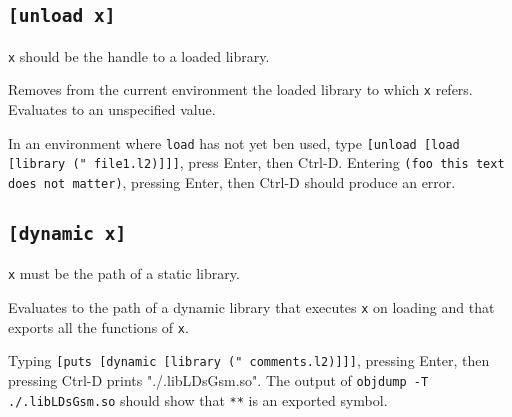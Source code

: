 \documentclass[twocolumn,landscape]{article}
\begin{document}
    \subsection{\lstinline{[unload x]}}
      \lstinline{x} should be the handle to a loaded library.

      Removes from the current environment the loaded library to which \lstinline{x} refers. Evaluates to an unspecified value.

      In an environment where \lstinline{load} has not yet ben used, type \lstinline{[unload [load [library (" file1.l2)]]]}, press Enter, then Ctrl-D. Entering \lstinline{(foo this text does not matter)}, pressing Enter, then Ctrl-D should produce an error.

    \subsection{\lstinline{[dynamic x]}}
      \lstinline{x} must be the path of a static library.

      Evaluates to the path of a dynamic library that executes \lstinline{x} on loading and that exports all the functions of \lstinline{x}.

      Typing \lstinline{[puts [dynamic [library (" comments.l2)]]]}, pressing Enter, then pressing Ctrl-D prints "./.libLDsGsm.so". The output of \lstinline{objdump -T ./.libLDsGsm.so} should show that \lstinline{**} is an exported symbol.
\end{document}
